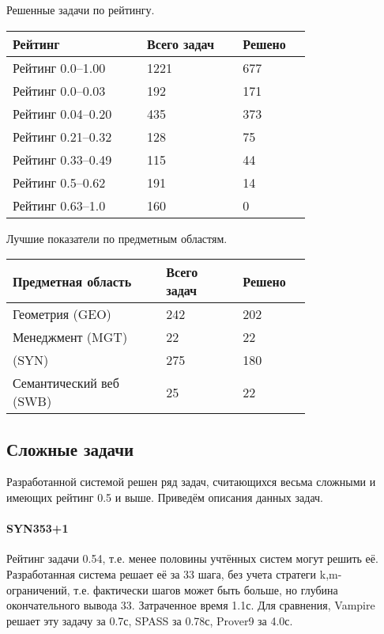 Решенные задачи по рейтингу.

\begin{longtable}[H]{|p{0.35\linewidth}|p{0.25\linewidth}|p{0.15\linewidth}|}
\hline
\textbf{Рейтинг} & \textbf{Всего задач} & \textbf{Решено} \\
\hline
Рейтинг 0.0--1.00 & 1221 & 677 \\
\hline
Рейтинг 0.0--0.03 & 192 & 171 \\
\hline
Рейтинг 0.04--0.20 & 435 & 373 \\
\hline
Рейтинг 0.21--0.32 & 128 & 75 \\
\hline
Рейтинг 0.33--0.49 & 115 & 44 \\
\hline
Рейтинг 0.5--0.62 & 191 & 14 \\
\hline
Рейтинг 0.63--1.0 & 160 & 0 \\
\hline
\end{longtable}


Лучшие показатели по предметным областям.

\begin{longtable}[H]{|p{0.4\linewidth}|p{0.2\linewidth}|p{0.15\linewidth}|}
\hline
\textbf{Предметная область} & \textbf{Всего задач} & \textbf{Решено} \\
\hline
Геометрия (GEO) & 242 & 202 \\
\hline
Менеджмент (MGT) & 22 & 22 \\
\hline
(SYN) & 275 & 180 \\
\hline
Семантический веб (SWB) & 25 & 22 \\
\hline
\end{longtable}





\subsection{Сложные задачи}




Разработанной системой решен ряд задач, считающихся весьма сложными и имеющих рейтинг 0.5 и выше. Приведём описания данных задач.

\paragraph{SYN353+1} Рейтинг задачи 0.54, т.е. менее половины учтённых систем могут решить её.
Разработанная система решает её за 33 шага, без учета стратеги k,m-ограничений, т.е. фактически шагов может быть больше, но глубина окончательного вывода 33. Затраченное время 1.1с. Для сравнения, Vampire решает эту задачу за 0.7с, SPASS за 0.78с, Prover9 за 4.0с.

